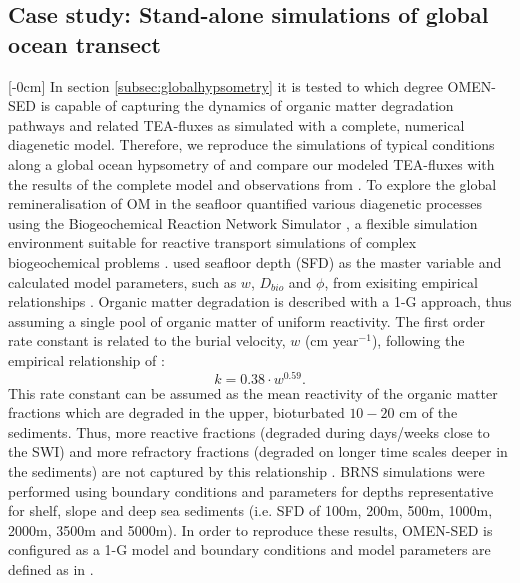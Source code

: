\documentclass[gmd, manuscript]{copernicus}
\begin{document}
\subsection{Case study: Stand-alone simulations of global ocean transect}
[-0cm]%
In section \ref{subsec:globalhypsometry} it is tested to which degree OMEN-SED is capable of capturing the dynamics of organic matter degradation pathways and related TEA-fluxes as simulated with a complete, numerical diagenetic model. 
Therefore, we reproduce the simulations of typical conditions along a global ocean hypsometry of \citet{thullner_global_scale_2009} and compare our modeled TEA-fluxes with the results of the complete model and observations 
from \citet{middelburg_denitrification_1996}. To explore the global remineralisation of OM in the seafloor 
\citet{thullner_global_scale_2009} quantified various diagenetic processes using the Biogeochemical Reaction Network Simulator \citep[BRNS,][]{aguilera_knowledge-based_2005}, 
a flexible simulation environment suitable for reactive transport simulations of complex biogeochemical problems \citep[e.g.][]{jourabchi_quantitative_2005, thullner_modeling_2005}. 
\citet{thullner_global_scale_2009} used seafloor depth (SFD) as the master variable and calculated model parameters, such as $w$, $D_{bio}$ and $\phi$, from exisiting empirical relationships 
\citep[e.g.][]{van1995metal, middelburg_empirical_1997}. 
Organic matter degradation is described with a 1-G approach, thus assuming a single pool of organic matter of uniform reactivity. 
The first order rate constant is related to the burial velocity, $w$ (cm year$^{-1}$), following the empirical relationship of \citet{boudreau1997diagenetic}:
\begin{equation}
 k=0.38\cdot w^{0.59}.
\end{equation}
This rate constant can be assumed as the mean reactivity of the organic matter fractions which are degraded in the upper, bioturbated $10-20$ cm of the sediments. 
Thus, more reactive fractions (degraded during days/weeks close to the SWI) and more refractory fractions (degraded on longer time scales deeper in the sediments) are not captured by this relationship \citep{boudreau1997diagenetic}. 
BRNS simulations were performed using boundary conditions and parameters for depths representative for shelf, slope and deep sea sediments (i.e. SFD of 100m, 200m, 500m, 1000m, 2000m, 3500m and 5000m). 
In order to reproduce these results, OMEN-SED is configured as a 1-G model and boundary conditions and model parameters are defined as in \citet[][see Table \ref{table:Hypsometry_params}]{thullner_global_scale_2009}. 
\end{document}
